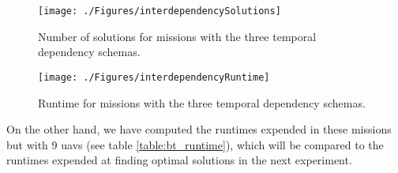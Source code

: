 		\begin{figure}[h]
			\centering
			\texttt{[image: ./Figures/interdependencySolutions]}
			\caption{Number of solutions for missions with the three temporal dependency schemas.}
			\label{fig:interdependencySolutions}
		\end{figure}
		\begin{figure}[h]
			\centering
			\texttt{[image: ./Figures/interdependencyRuntime]}
			\caption{Runtime for missions with the three temporal dependency schemas.}
			\label{fig:interdependencyRuntime}
		\end{figure}

On the other hand, we have computed the runtimes expended in these missions but with 9 \glspl{uav} (see table \ref{table:bt_runtime}), which will be compared to the runtimes expended at finding optimal solutions in the next experiment.

